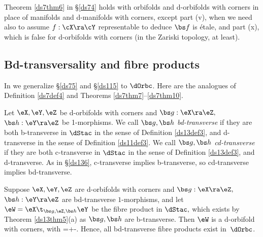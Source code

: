 \documentclass{article}
\begin{document}
Theorem \ref{ds7thm6} in \S\ref{ds74} holds with orbifolds and
d-orbifolds with corners in place of manifolds and d-manifolds with
corners, except part (v), when we need also to assume $f:\cX\ra\cY$
representable to deduce $\bs f$ is \'etale, and part (x), which is
false for d-orbifolds with corners (in the Zariski
topology, at least).

\subsection{Bd-transversality and fibre products}
\label{ds145}

In \cite[\S 12.5]{Joyc6} we generalize \S\ref{ds75} and
\S\ref{ds115} to $\dOrbc$. Here are the analogues of Definition
\ref{ds7def4} and Theorems \ref{ds7thm7}--\ref{ds7thm10}.

\begin{dfn} Let $\eX,\eY,\eZ$ be d-orbifolds with corners and
$\bs g:\eX\ra\eZ,$ $\bs h:\eY\ra\eZ$ be 1-morphisms. We call $\bs
g,\bs h$ {\it bd-transverse\/} if they are both b-transverse in
$\dStac$ in the sense of Definition \ref{ds13def3}, and d-transverse
in the sense of Definition \ref{ds11def3}. We call $\bs g,\bs h$
{\it cd-transverse\/} if they are both c-transverse in $\dStac$ in
the sense of Definition \ref{ds13def3}, and d-transverse. As in
\S\ref{ds136}, c-transverse implies b-transverse, so cd-transverse
implies bd-transverse.
\label{ds14def4}
\end{dfn}

\begin{thm} Suppose\/ $\eX,\eY,\eZ$ are d-orbifolds with corners
and\/ $\bs g:\eX\ra\eZ,$ $\bs h:\eY\ra\eZ$ are bd-transverse
$1$-morphisms, and let\/ $\eW=\eX\t_{\bs g,\eZ,\bs h}\eY$ be the
fibre product in $\dStac,$ which exists by Theorem\/
{\rm\ref{ds13thm5}(a)} as $\bs g,\bs h$ are b-transverse. Then $\eW$
is a d-orbifold with corners, with
\e
\vdim\eW=\vdim\eX+\vdim\eY-\vdim\eZ.
\label{ds14eq1}
\e
Hence, all bd-transverse fibre products exist
in\/~$\dOrbc$.
\label{ds14thm6}
\end{thm}
\end{document}
